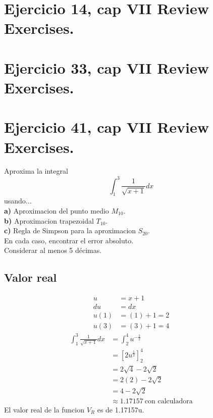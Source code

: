 \documentclass[11pt,letterpaper]{article}
\begin{document}
\section{Ejercicio 14, cap VII Review Exercises.}

\section{Ejercicio 33, cap VII Review Exercises.}

\section{Ejercicio 41, cap VII Review Exercises.}
Aproxima la integral
\begin{equation*}
  \int_1^3 \frac{1}{\sqrt{x+1}}dx
\end{equation*}
usando...\\
\textbf{a)} Aproximacion del punto medio $M_{10}$.\\
\textbf{b)} Aproximacion trapezoidal $T_{10}$.\\
\textbf{c)} Regla de Simpson para la aproximacion $S_{20}$.\\
En cada caso, encontrar el error absoluto.\\
Considerar al menos 5 décimas.
\subsection*{Valor real}
\begin{equation*}
  \begin{split}
    u &= x+1\\
    du &= dx\\
    u(1) &= (1)+1 = 2\\
    u(3) &= (3)+1 = 4 
  \end{split}
\end{equation*}
\begin{equation*}
  \begin{split}
    \int_1^3 \frac{1}{\sqrt{x+1}}dx &= \int_2^4 u^{-\frac{1}{2}}\\
    &=\left[ 2u^{\frac{1}{2}} \right]_2^4\\
    &=2\sqrt{4}-2\sqrt{2}\\
    &=2(2)-2\sqrt{2}\\
    &=4-2\sqrt{2}\\
    &\approx 1.17157 \ \text{con calculadora}
  \end{split}
  \end{equation*}
El valor real de la funcion $V_R$ es de 1.17157u.
  
\end{document}
